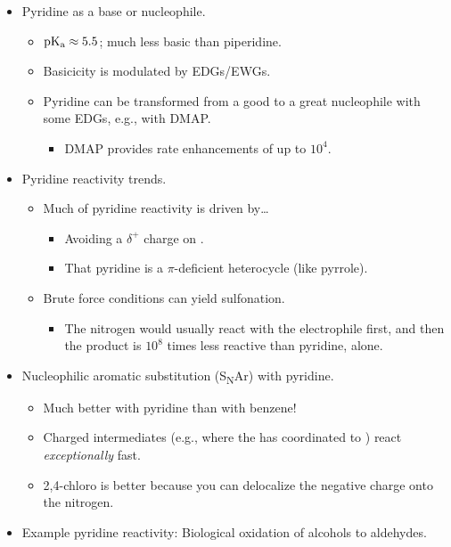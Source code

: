\documentclass[../notes.tex]{subfiles}
\begin{document}
\begin{itemize}
\begin{itemize}
    \end{itemize}
    \item Pyridine as a base or nucleophile.
    \begin{itemize}
        \item $\operatorname{\text{p}K_\text{a}}\approx 5.5$; much less basic than piperidine.
        \item Basicicity is modulated by EDGs/EWGs.
        \item Pyridine can be transformed from a good to a great nucleophile with some EDGs, e.g., with DMAP.
        \begin{itemize}
            \item DMAP provides rate enhancements of up to $10^4$.
        \end{itemize}
    \end{itemize}
    \item Pyridine reactivity trends.
    \begin{itemize}
        \item Much of pyridine reactivity is driven by\dots
        \begin{itemize}
            \item Avoiding a $\delta^+$ charge on .
            \item That pyridine is a $\pi$-deficient heterocycle (like pyrrole).
        \end{itemize}
        \item Brute force conditions can yield sulfonation.
        \begin{itemize}
            \item The nitrogen would usually react with the electrophile first, and then the product is $10^8$ times less reactive than pyridine, alone.
        \end{itemize}
    \end{itemize}
    \item Nucleophilic aromatic substitution (S\textsubscript{N}Ar) with pyridine.
    \begin{itemize}
        \item Much better with pyridine than with benzene!
        \item Charged intermediates (e.g., where the  has coordinated to ) react \emph{exceptionally} fast.
        \item 2,4-chloro is better because you can delocalize the negative charge onto the nitrogen.
    \end{itemize}
    \item Example pyridine reactivity: Biological oxidation of alcohols to aldehydes.

\end{itemize}
\end{document}
